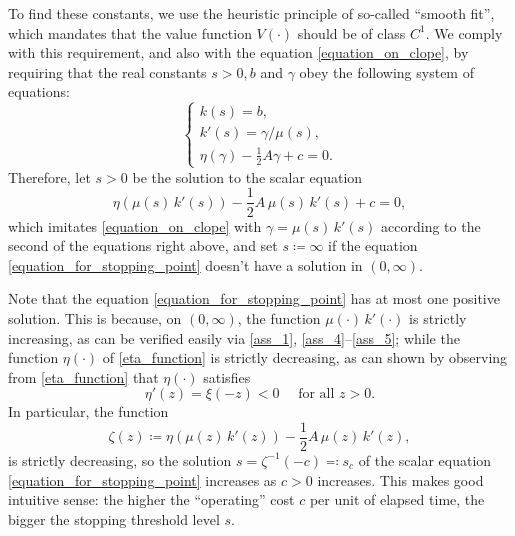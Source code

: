 \documentclass[11pt,tbtags,reqno]{article}
\theoremstyle{definition}
\numberwithin{equation}{section}
\theoremstyle{definition}
\begin{document}
To find these constants, we use the heuristic principle of so-called ``smooth fit'', which mandates that the value function $V(\cdot)$ should be of class $C^1$. We comply with this requirement, and also with the equation \eqref{equation_on_clope}, by requiring that the real constants $s > 0, b$ and $\gamma$ obey the following system of equations:
\begin{equation}
    \begin{cases}
        k(s) = b, \\
        k'(s) = \gamma / \mu(s), \\
        \eta(\gamma) - \frac{1} {2}A\gamma + c = 0.
    \end{cases}
\end{equation}
Therefore, let $s>0$ be the solution to the scalar equation
\begin{equation}\label{equation_for_stopping_point}
    \eta(\mu(s) \, k'(s)) -\frac{1}{2}A\, \mu(s) \, k'(s) + c = 0,
\end{equation}
which imitates \eqref{equation_on_clope} with $\gamma = \mu(s) \, k'(s)$ according to the second of the equations right above, and set $s \coloneqq \infty$ if the equation \eqref{equation_for_stopping_point} doesn't have a solution in $(0, \infty)$. 

Note that the equation \eqref{equation_for_stopping_point} has at most one positive solution. This is because, on $(0, \infty)$, the function $\mu(\cdot) \, k'(\cdot)$ is strictly increasing, as can be verified easily via \ref{ass_1}, \ref{ass_4}--\ref{ass_5}; while the function $\eta(\cdot)$ of \eqref{eta_function} is strictly decreasing, as can shown by observing from \eqref{eta_function} that $\eta(\cdot)$ satisfies 
\begin{equation}\label{properties_of_eta}
    \eta'(z) = \xi(-z) < 0 \quad \text{ for all } z > 0.
\end{equation}
In particular, the function 
\begin{equation}\label{def_zeta_function}
    \zeta(z) \coloneqq \eta(\mu(z) \, k'(z)) -\frac{1}{2}A\, \mu(z) \, k'(z),
\end{equation}
is strictly decreasing, so the solution $s = \zeta^{-1}(-c) \eqqcolon s_c$ of the scalar equation \eqref{equation_for_stopping_point} increases as $c > 0$ increases. This makes good intuitive sense: the higher the ``operating'' cost $c$ per unit of elapsed time, the bigger the stopping threshold level $s$.
\end{document}
